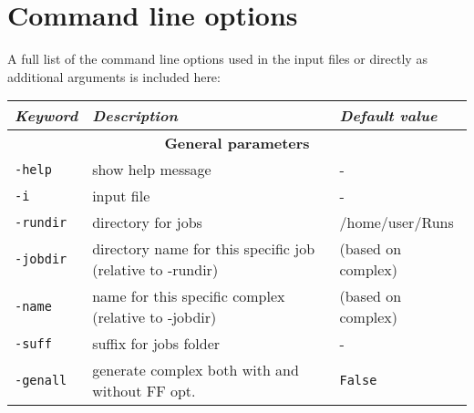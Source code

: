 \section{Command line options}

A full list of the command line options used in the input files or directly as additional arguments is included here: \\


\centering
\small
\begin{tabular}{|p{4.5cm}|p{8cm}|p{3cm}|}
\hline
\textit{\textbf{Keyword}} & \textit{\textbf{Description}} & \textit{\textbf{Default value}} \\
\hline
\multicolumn{3}{|c|}{\Large \textbf{General parameters}}\\ \hline
\texttt{-help} & show help message & - \\
\texttt{-i} & input file & - \\
\texttt{-rundir} & directory for jobs & /home/user/Runs \\
\texttt{-jobdir} & directory name for this specific job (relative to -rundir)  & (based on complex) \\
\texttt{-name} & name for this specific complex (relative to -jobdir)  & (based on complex)\footnotemark\\
\texttt{-suff} & suffix for jobs folder & - \\
\texttt{-genall} & generate complex both with and without FF opt. & \texttt{False} \\
\hline
\end{tabular}
